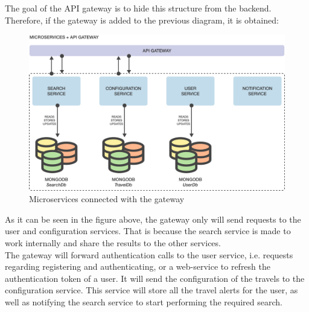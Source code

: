 \documentclass[./chapters/design.tex]{subfiles}
\begin{document}
The goal of the API gateway is to hide this structure from the backend.
Therefore, if the gateway is added to the previous diagram, it is obtained:
\begin{figure}[H]
	\centering
	\includegraphics[width=\textwidth]{./assets/microservice-gateway-struct.png}
	\caption{Microservices connected with the gateway}
\end{figure}
As it can be seen in the figure above, the gateway only will send requests to
the user and configuration services. That is because the search service is made
to work internally and share the results to the other services.
\\
The gateway will forward authentication calls to the user service, i.e. requests
regarding registering and authenticating, or a web-service to refresh the
authentication token of a user. It will send the configuration of the travels to
the configuration service. This service will store all the travel alerts for the
user, as well as notifying the search service to start performing the required
search.
\end{document}
